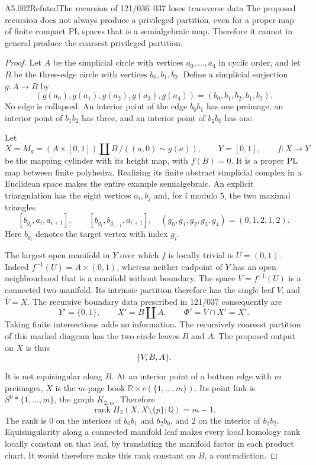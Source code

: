 \begin{saresult}{A5.002}{Refuted}{The recursion of 121/036--037 loses transverse data}
The proposed recursion does not always produce a privileged partition,
even for a proper map of finite compact PL spaces that is a
semialgebraic map.  Therefore it cannot in general produce the
coarsest privileged partition.
\end{saresult}
\begin{proof}
Let $A$ be the simplicial circle with vertices $a_0,\ldots,a_4$ in
cyclic order, and let $B$ be the three-edge circle with vertices
$b_0,b_1,b_2$.  Define a simplicial surjection $g:A\to B$ by
\[
 (g(a_0),g(a_1),g(a_2),g(a_3),g(a_4))
       =(b_0,b_1,b_2,b_1,b_2).
\]
No edge is collapsed.  An interior point of the edge $b_0b_1$ has one
preimage, an interior point of $b_1b_2$ has three, and an interior
point of $b_2b_0$ has one.

Let
\[
 X=M_g=(A\times[0,1])\coprod B\,/
             ((a,0)\sim g(a)),\qquad
 Y=[0,1],\qquad f:X\longrightarrow Y
\]
be the mapping cylinder with its height map, with $f(B)=0$.
It is a proper PL map between finite polyhedra.  Realizing its finite
abstract simplicial complex in a Euclidean space makes the entire
example semialgebraic.  An explicit triangulation has the eight
vertices $a_i,b_j$ and, for $i$ modulo $5$, the two maximal triangles
\[
 [b_{g_i},a_i,a_{i+1}],\qquad
 [b_{g_i},b_{g_{i+1}},a_{i+1}],
 \quad(g_0,g_1,g_2,g_3,g_4)=(0,1,2,1,2).
\]
Here $b_{g_i}$ denotes the target vertex with index $g_i$.

The largest open manifold in $Y$ over which $f$ is locally trivial is
$U=(0,1)$.  Indeed $f^{-1}(U)=A\times(0,1)$, whereas neither endpoint
of $Y$ has an open neighbourhood that is a manifold without boundary.
The space $V=f^{-1}(U)$ is a connected two-manifold.  Its intrinsic
partition therefore has the single leaf $V$, and $\overline V=X$.
The recursive boundary data prescribed in 121/037 consequently are
\[
 Y'=\{0,1\},\qquad X'=B\coprod A,\qquad
 \Phi'=\overline V\cap X'=X'.
\]
Taking finite intersections adds no information.  The recursively
coarsest partition of this marked diagram has the two circle leaves
$B$ and $A$.  The proposed output on $X$ is thus
\[
                  \{V,B,A\}.
\]

It is not equisingular along $B$.  At an interior point of a bottom
edge with $m$ preimages, $X$ is the $m$-page book
$\mathbb R\times c(\{1,\ldots,m\})$.  Its point link is
$S^0*\{1,\ldots,m\}$, the graph $K_{2,m}$.  Therefore
\[
 \operatorname{rank} H_2(X,X\setminus\{p\};\mathbb Q)=m-1.
\]
The rank is $0$ on the interiors of $b_0b_1$ and $b_2b_0$, and $2$
on the interior of $b_1b_2$.  Equisingularity along a connected
manifold leaf makes every local homology rank locally constant on
that leaf, by translating the manifold factor in each product chart.
It would therefore make this rank constant on $B$, a contradiction.


\end{proof}

